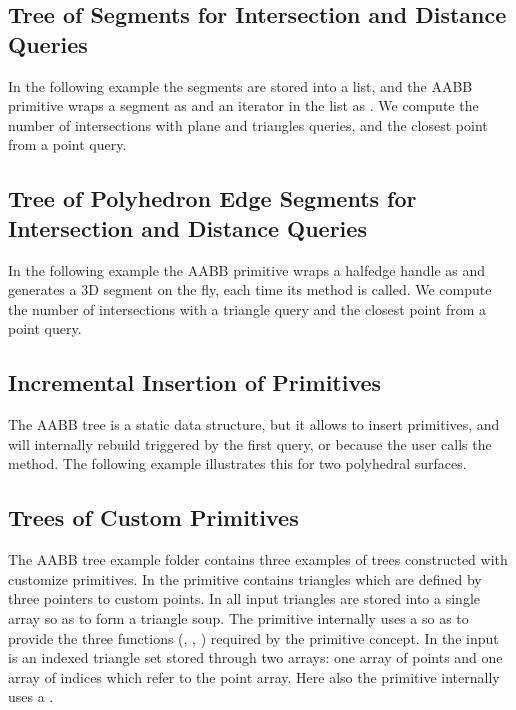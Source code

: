 \subsection{Tree of Segments for Intersection and Distance Queries}
In the following example the segments are stored into a list, and the AABB primitive wraps a segment as  and an iterator in the list as . We compute the number of intersections with plane and triangles queries, and the closest point from a point query. 

\subsection{Tree of Polyhedron Edge Segments for Intersection and Distance Queries}
In the following example the AABB primitive wraps a halfedge handle as  and generates a 3D segment on the fly, each time its method  is called. We compute the number of intersections with a triangle query and the closest point from a point query. 

\subsection{Incremental Insertion of Primitives}
The AABB tree is a static data structure, but it allows to insert primitives, and will internally
rebuild triggered by the first query, or because the user calls the  method.
The following example illustrates this for two polyhedral surfaces.


\subsection{Trees of Custom Primitives}

The AABB tree example folder contains three examples of trees constructed with customize primitives. In  the primitive contains triangles which are defined by three pointers to custom points. In  all input triangles are stored into a single array so as to form a triangle soup. The primitive internally uses a  so as to provide the three functions (, , ) required by the primitive concept. In  the input is an indexed triangle set stored through two arrays: one array of points and one array of indices which refer to the point array. Here also the primitive internally uses a .

